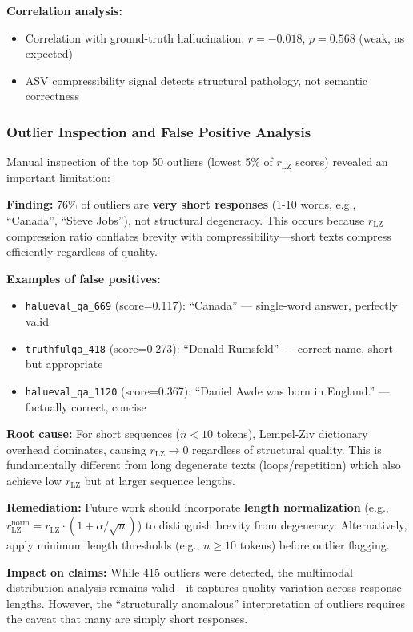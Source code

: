 \documentclass[11pt]{article}
\begin{document}
\textbf{Correlation analysis:}
\begin{itemize}
\item Correlation with ground-truth hallucination: $r = -0.018$, $p = 0.568$ (weak, as expected)
\item ASV compressibility signal detects structural pathology, not semantic correctness
\end{itemize}

\subsubsection{Outlier Inspection and False Positive Analysis}

Manual inspection of the top 50 outliers (lowest 5\% of $r_{\text{LZ}}$ scores) revealed an important limitation:

\textbf{Finding:} 76\% of outliers are \textbf{very short responses} (1-10 words, e.g., ``Canada'', ``Steve Jobs''), not structural degeneracy. This occurs because $r_{\text{LZ}}$ compression ratio conflates brevity with compressibility---short texts compress efficiently regardless of quality.

\textbf{Examples of false positives:}
\begin{itemize}
\item \texttt{halueval\_qa\_669} (score=0.117): ``Canada'' --- single-word answer, perfectly valid
\item \texttt{truthfulqa\_418} (score=0.273): ``Donald Rumsfeld'' --- correct name, short but appropriate
\item \texttt{halueval\_qa\_1120} (score=0.367): ``Daniel Awde was born in England.'' --- factually correct, concise
\end{itemize}

\textbf{Root cause:} For short sequences ($n < 10$ tokens), Lempel-Ziv dictionary overhead dominates, causing $r_{\text{LZ}} \to 0$ regardless of structural quality. This is fundamentally different from long degenerate texts (loops/repetition) which also achieve low $r_{\text{LZ}}$ but at larger sequence lengths.

\textbf{Remediation:} Future work should incorporate \textbf{length normalization} (e.g., $r_{\text{LZ}}^{\text{norm}} = r_{\text{LZ}} \cdot (1 + \alpha/\sqrt{n})$) to distinguish brevity from degeneracy. Alternatively, apply minimum length thresholds (e.g., $n \geq 10$ tokens) before outlier flagging.

\textbf{Impact on claims:} While 415 outliers were detected, the multimodal distribution analysis remains valid---it captures quality variation across response lengths. However, the ``structurally anomalous'' interpretation of outliers requires the caveat that many are simply short responses.
\end{document}
